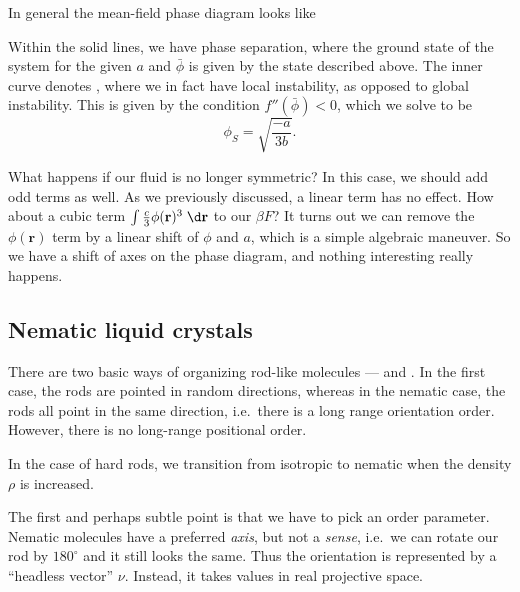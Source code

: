 \documentclass[a4paper]{article}
\begin{document}
In general the mean-field phase diagram looks like
\begin{center}
\end{center}
Within the solid lines, we have phase separation, where the ground state of the system for the given $a$ and $\bar{\phi}$ is given by the state described above. The inner curve denotes , where we in fact have local instability, as opposed to global instability. This is given by the condition $f''(\bar{\phi}) < 0$, which we solve to be
\[
  \phi_S = \sqrt{\frac{-a}{3b}}.
\]

What happens if our fluid is no longer symmetric? In this case, we should add odd terms as well. As we previously discussed, a linear term has no effect. How about a cubic term $\int \frac{c}{3} \phi(\mathbf{r})^3 \;\d \mathbf{r}$ to our $\beta F$? It turns out we can remove the $\phi(\mathbf{r})$ term by a linear shift of $\phi$ and $a$, which is a simple algebraic maneuver. So we have a shift of axes on the phase diagram, and nothing interesting really happens.

\subsection{Nematic liquid crystals}
There are two basic ways of organizing rod-like molecules ---  and . In the first case, the rods are pointed in random directions, whereas in the nematic case, the rods all point in the same direction, i.e.\ there is a long range orientation order. However, there is no long-range positional order.

In the case of hard rods, we transition from isotropic to nematic when the density $\rho$ is increased.

The first and perhaps subtle point is that we have to pick an order parameter. Nematic molecules have a preferred \emph{axis}, but not a \emph{sense}, i.e.\ we can rotate our rod by $180^\circ$ and it still looks the same. Thus the orientation is represented by a ``headless vector'' $\nu$. Instead, it takes values in real projective space.
\end{document}
